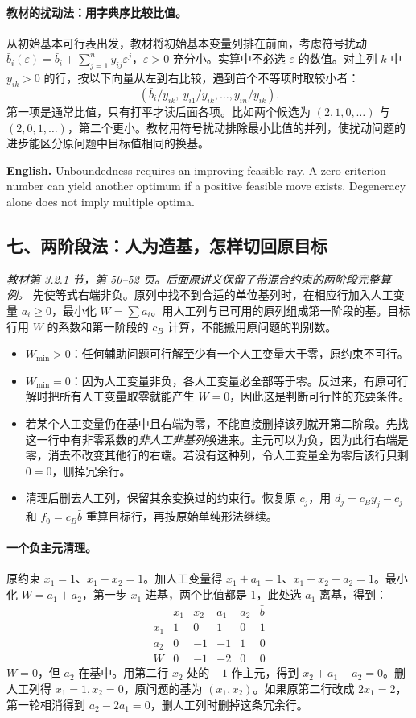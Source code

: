 \documentclass[UTF8,11pt,a4paper]{ctexart}
\newcommand{\EN}[1]{\par\noindent \textbf{English.} #1\par}
\begin{document}
\paragraph{教材的扰动法：用字典序比较比值。}
从初始基本可行表出发，教材将初始基本变量列排在前面，考虑符号扰动 $\bar b_i(\varepsilon)=\bar b_i+\sum_{j=1}^n y_{ij}\varepsilon^j$，$\varepsilon>0$ 充分小。实算中不必选 $\varepsilon$ 的数值。对主列 $k$ 中 $y_{ik}>0$ 的行，按以下向量从左到右比较，遇到首个不等项时取较小者：
\[
\left(\bar b_i/y_{ik},\ y_{i1}/y_{ik},\ldots,y_{in}/y_{ik}\right).
\]
第一项是通常比值，只有打平才读后面各项。比如两个候选为 $(2,1,0,\ldots)$ 与 $(2,0,1,\ldots)$，第二个更小。教材用符号扰动排除最小比值的并列，使扰动问题的进步能区分原问题中目标值相同的换基。
\EN{Unboundedness requires an improving feasible ray. A zero criterion number can yield another optimum if a positive feasible move exists. Degeneracy alone does not imply multiple optima.}

\clearpage
\subsection*{七、两阶段法：人为造基，怎样切回原目标}
\noindent\textit{教材第 3.2.1 节，第 50--52 页。后面原讲义保留了带混合约束的两阶段完整算例。}
先使等式右端非负。原列中找不到合适的单位基列时，在相应行加入人工变量 $a_i\ge0$，最小化 $W=\sum a_i$。用人工列与已可用的原列组成第一阶段的基。目标行用 $W$ 的系数和第一阶段的 $c_B$ 计算，不能搬用原问题的判别数。
\begin{itemize}
\item $W_{\min}>0$：任何辅助问题可行解至少有一个人工变量大于零，原约束不可行。
\item $W_{\min}=0$：因为人工变量非负，各人工变量必全部等于零。反过来，有原可行解时把所有人工变量取零就能产生 $W=0$，因此这是判断可行性的充要条件。
\item 若某个人工变量仍在基中且右端为零，不能直接删掉该列就开第二阶段。先找这一行中有非零系数的\emph{非人工非基列}换进来。主元可以为负，因为此行右端是零，消去不改变其他行的右端。若没有这种列，令人工变量全为零后该行只剩 $0=0$，删掉冗余行。
\item 清理后删去人工列，保留其余变换过的约束行。恢复原 $c_j$，用 $d_j=c_By_j-c_j$ 和 $f_0=c_B\bar b$ 重算目标行，再按原始单纯形法继续。
\end{itemize}
\paragraph{一个负主元清理。}
原约束 $x_1=1$、$x_1-x_2=1$。加人工变量得 $x_1+a_1=1$、$x_1-x_2+a_2=1$。最小化 $W=a_1+a_2$，第一步 $x_1$ 进基，两个比值都是 1，此处选 $a_1$ 离基，得到：
\[
\begin{array}{c|rrrr|r}
 &x_1&x_2&a_1&a_2&\bar b\\\hline
 x_1&1&0&1&0&1\\
 a_2&0&-1&-1&1&0\\\hline
 W&0&-1&-2&0&0
\end{array}
\]
$W=0$，但 $a_2$ 在基中。用第二行 $x_2$ 处的 $-1$ 作主元，得到 $x_2+a_1-a_2=0$。删人工列得 $x_1=1,x_2=0$，原问题的基为 $(x_1,x_2)$。如果原第二行改成 $2x_1=2$，第一轮相消得到 $a_2-2a_1=0$，删人工列时删掉这条冗余行。
\end{document}
